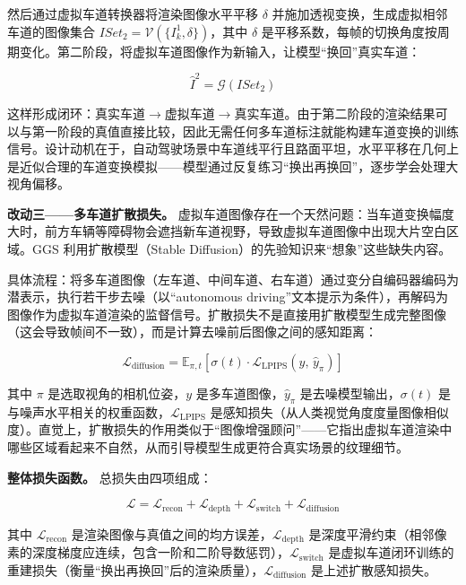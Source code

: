 然后通过虚拟车道转换器将渲染图像水平平移 $\delta$ 并施加透视变换，生成虚拟相邻车道的图像集合 $ISet_2 = \mathcal{V}(\{I_k^1, \delta\})$，其中 $\delta$ 是平移系数，每帧的切换角度按周期变化。第二阶段，将虚拟车道图像作为新输入，让模型``换回''真实车道：

\begin{equation}
\hat{I}^2 = \mathcal{G}(ISet_2)
\end{equation}

这样形成闭环：$\text{真实车道} \to \text{虚拟车道} \to \text{真实车道}$。由于第二阶段的渲染结果可以与第一阶段的真值直接比较，因此无需任何多车道标注就能构建车道变换的训练信号。设计动机在于，自动驾驶场景中车道线平行且路面平坦，水平平移在几何上是近似合理的车道变换模拟——模型通过反复练习``换出再换回''，逐步学会处理大视角偏移。

\textbf{改动三——多车道扩散损失。} 虚拟车道图像存在一个天然问题：当车道变换幅度大时，前方车辆等障碍物会遮挡新车道视野，导致虚拟车道图像中出现大片空白区域。GGS 利用扩散模型（Stable Diffusion）的先验知识来``想象''这些缺失内容。

具体流程：将多车道图像（左车道、中间车道、右车道）通过变分自编码器编码为潜表示，执行若干步去噪（以``autonomous driving''文本提示为条件），再解码为图像作为虚拟车道渲染的监督信号。扩散损失不是直接用扩散模型生成完整图像（这会导致帧间不一致），而是计算去噪前后图像之间的感知距离：

\begin{equation}
\mathcal{L}_{\text{diffusion}} = \mathbb{E}_{\pi, t}\left[\sigma(t) \cdot \mathcal{L}_{\text{LPIPS}}(y,\, \hat{y}_\pi)\right]
\end{equation}

其中 $\pi$ 是选取视角的相机位姿，$y$ 是多车道图像，$\hat{y}_\pi$ 是去噪模型输出，$\sigma(t)$ 是与噪声水平相关的权重函数，$\mathcal{L}_{\text{LPIPS}}$ 是感知损失（从人类视觉角度度量图像相似度）。直觉上，扩散损失的作用类似于``图像增强顾问''——它指出虚拟车道渲染中哪些区域看起来不自然，从而引导模型生成更符合真实场景的纹理细节。

\textbf{整体损失函数。} 总损失由四项组成：

\begin{equation}
\mathcal{L} = \mathcal{L}_{\text{recon}} + \mathcal{L}_{\text{depth}} + \mathcal{L}_{\text{switch}} + \mathcal{L}_{\text{diffusion}}
\end{equation}

其中 $\mathcal{L}_{\text{recon}}$ 是渲染图像与真值之间的均方误差，$\mathcal{L}_{\text{depth}}$ 是深度平滑约束（相邻像素的深度梯度应连续，包含一阶和二阶导数惩罚），$\mathcal{L}_{\text{switch}}$ 是虚拟车道闭环训练的重建损失（衡量``换出再换回''后的渲染质量），$\mathcal{L}_{\text{diffusion}}$ 是上述扩散感知损失。


